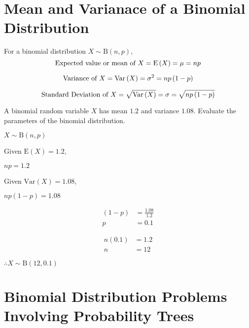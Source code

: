 \documentclass[11pt,a4paper]{book}
\begin{document}
\section{Mean and Varianace of a Binomial Distribution}

\begin{tcolorbox}[colback=blue!5, colframe=black, boxrule=.4pt, sharpish corners]

For a binomial distribution $X\sim\text{B}\left(n,p\right)$,
\[
\text{Expected value or mean of \ensuremath{X}}=\text{E}\left(X\right)=\mu=np
\]

\[
\text{Variance of \ensuremath{X}}=\text{Var}\left(X\right)=\sigma^{2}=np\left(1-p\right)
\]

\[
\text{Standard Deviation of \ensuremath{X}}=\sqrt{\text{Var}\left(X\right)}=\sigma=\sqrt{np\left(1-p\right)}
\]
\end{tcolorbox}

\begin{example}

A binomial random variable $X$ has mean $1.2$ and variance $1.08$.
Evaluate the parameters of the binomial distribution.

\Solution

$X\sim\text{B}\left(n,p\right)$

Given $\text{E}\left(X\right)=1.2$,

$np=1.2$

Given $\text{Var}\left(X\right)=1.08$,

$np\left(1-p\right)=1.08$

\begin{align*}
\left(1-p\right) & =\frac{1.08}{1.2}\\
p & =0.1
\end{align*}

\begin{align*}
n\left(0.1\right) & =1.2\\
n & =12
\end{align*}

$\therefore X\sim\text{B}\left(12,0.1\right)$
\end{example}

\newpage


\section{Binomial Distribution Problems Involving Probability Trees}
\end{document}
